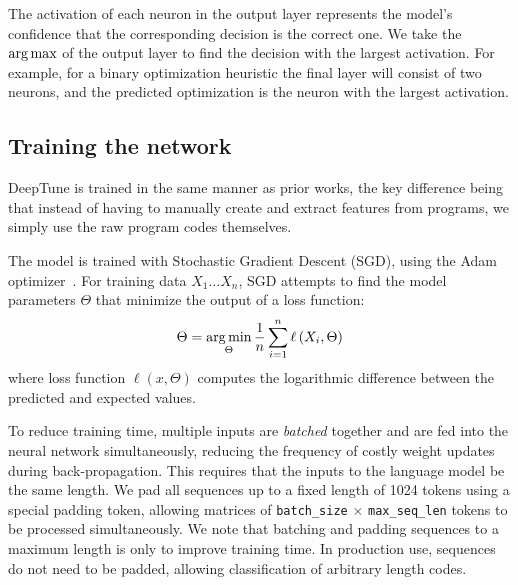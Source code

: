 The activation of each neuron in the output layer represents the model's confidence that the corresponding decision is the correct one. We take the $\operatorname*{arg\,max}$ of the output layer to find the decision with the largest activation. For example, for a binary optimization heuristic the final layer will consist of two neurons, and the predicted optimization is the neuron with the largest activation.


\subsection{Training the network}

DeepTune is trained in the same manner as prior works, the key difference being that instead of having to manually create and extract features from programs, we simply use the raw program codes themselves.

The model is trained with Stochastic Gradient Descent (SGD), using the Adam optimizer~\cite{Kingma2015}. For training data $X_1 \ldots X_n$, SGD attempts to find the model parameters $\Theta$ that minimize the output of a loss function:
%
\begin{equation}
\Theta = \operatorname*{arg\,min}_{\Theta} \frac{1}{n} \sum_{i=1}^{n} \ell \left(X_i, \Theta \right)
\end{equation}
%
where loss function $\ell \left(x, \Theta \right)$ computes the logarithmic difference between the predicted and expected values.

To reduce training time, multiple inputs are \emph{batched} together and are fed into the neural network simultaneously, reducing the frequency of costly weight updates during back-propagation. This requires that the inputs to the language model be the same length. We pad all sequences up to a fixed length of 1024 tokens using a special padding token, allowing matrices of \texttt{batch\_size} $\times$ \texttt{max\_seq\_len} tokens to be processed simultaneously. We note that batching and padding sequences to a maximum length is only to improve training time. In production use, sequences do not need to be padded, allowing classification of arbitrary length codes.
